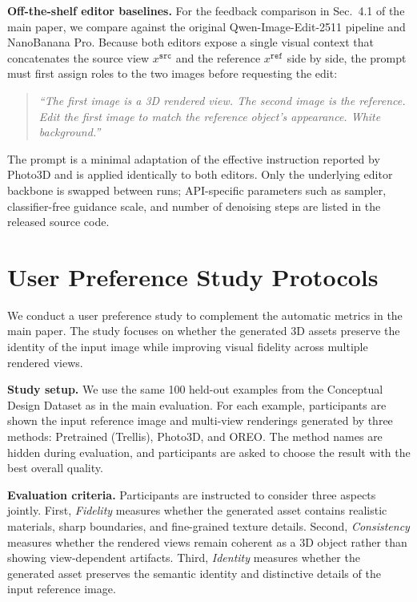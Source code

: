 \documentclass[runningheads]{llncs}
\begin{document}
\textbf{Off-the-shelf editor baselines.}
For the feedback comparison in Sec.~4.1 of the main paper, we compare against the original Qwen-Image-Edit-2511 pipeline and NanoBanana Pro.
Because both editors expose a single visual context that concatenates the source view $x^{\texttt{src}}$ and the reference $x^{\texttt{ref}}$ side by side, the prompt must first assign roles to the two images before requesting the edit:
\begin{quote}
\itshape
``The first image is a 3D rendered view. The second image is the reference. Edit the first image to match the reference object's appearance. White background.''
\end{quote}
The prompt is a minimal adaptation of the effective instruction reported by Photo3D and is applied identically to both editors.
Only the underlying editor backbone is swapped between runs; API-specific parameters such as sampler, classifier-free guidance scale, and number of denoising steps are listed in the released source code.

\section{User Preference Study Protocols}
\label{sec:user_study_details}
We conduct a user preference study to complement the automatic metrics in the main paper.
The study focuses on whether the generated 3D assets preserve the identity of the input image while improving visual fidelity across multiple rendered views.

\textbf{Study setup.}
We use the same 100 held-out examples from the Conceptual Design Dataset as in the main evaluation.
For each example, participants are shown the input reference image and multi-view renderings generated by three methods: Pretrained (Trellis), Photo3D, and OREO.
The method names are hidden during evaluation, and participants are asked to choose the result with the best overall quality.

\textbf{Evaluation criteria.}
Participants are instructed to consider three aspects jointly.
First, \textit{Fidelity} measures whether the generated asset contains realistic materials, sharp boundaries, and fine-grained texture details.
Second, \textit{Consistency} measures whether the rendered views remain coherent as a 3D object rather than showing view-dependent artifacts.
Third, \textit{Identity} measures whether the generated asset preserves the semantic identity and distinctive details of the input reference image.
\end{document}
